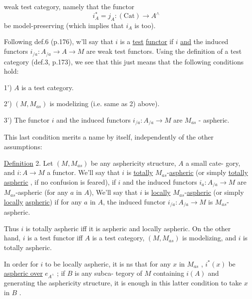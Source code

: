 
weak test category, namely that the functor
\[ i^{*}_{A} = j_{A} : (\mathrm{Cat}) \longrightarrow A^{\wedge} \]
be model-preserving (which implies that $i_{A}$ is too).

Following def.6 (p.176), w'll say that $i$ is a \uline{test} \uline{functor} if $i$
\uline{and} the induced functors $i_{/a} : A_{/a} \longrightarrow A \longrightarrow M$ are weak test functors.
Using the definition of a test category (def.3, p.173), we see that this
just means that the following conditions hold:

1') $A$ is a test category.

2') $(M,M_{as})$ is modelizing (i.e. same as 2) above).

3') The functor $i$ and the induced functors $i_{/a} : A_{/a} \rightarrow M$ are 
$M_{as}$ - aspheric.

This last condition merits a name by itself, independently of the
other assumptions:

\uline{Definition} 2. Let $(M,M_{as})$ be any asphericity structure, $A$ a small cate-%
gory, and $i: A \rightarrow M$ a functor. We'll say that $i$ is \uline{totally} $M_{as}$-\uline{aspheric}
(or simply \uline{totally} \uline{aspheric} , if no confusion is feared), if $i$ and 
the induced functors $i_{a} : A_{/a} \longrightarrow M$ are $M_{as}$-aspheric (for any $a$ in $A$),
We'll say that $i$ is \uline{locally} $M_{as}$-\uline{aspheric} (or simply \uline{locally} \uline{aspheric})
if for any $a$ in $A$, the induced functor $i_{/a} : A_{/a} \longrightarrow M$ is $M_{as}$-aspheric.

Thus $i$ is totally aspheric iff it is aspheric and locally aspheric.
On the other hand, $i$ is a test functor iff $A$ is a test category, $(M,M_{as})$
is modelizing, and $i$ is totally aspheric.

In order for $i$ to be locally aspheric, it is ns that  for any
$x$ in $M_{as}$ , $i^{*}(x)$ be \uline{aspheric over} $e_{A^{\wedge}}$ ; if $B$ is any  subca-%
tegory of $M$ containing $i(A)$ and generating the asphericity structure,
it is enough in this latter condition to take $x$ in $B$ .

